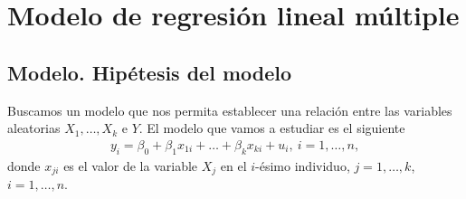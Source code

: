 \chapter{Modelo de regresión lineal múltiple}

\section{Modelo. Hipétesis del modelo}
Buscamos un modelo que nos permita establecer una relación entre las variables aleatorias $X_1,\ldots,X_k$ e $Y$. El modelo que vamos a estudiar es el siguiente
\begin{align*}
    y_i = \beta_0 + \beta_1 x_{1i} + \ldots + \beta_k x_{ki} + u_i, \ i = 1,\ldots,n,
\end{align*}
donde $x_{ji}$ es el valor de la variable $X_j$ en el $i$-ésimo individuo, $j = 1,\ldots,k$, $i=1,\ldots,n$.

